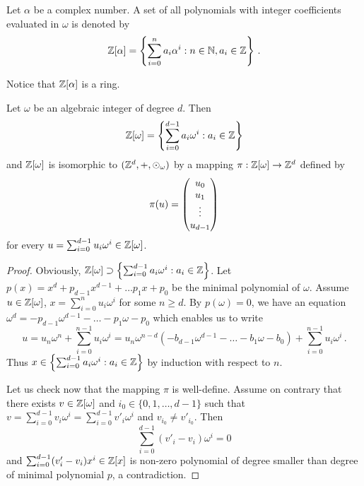 \begin{defn}
Let $\alpha$ be a complex number. A set of all polynomials with integer coefficients evaluated in $\omega$ is denoted by
$$
    \mathbb{Z}[\alpha] =\left\{\sum_{i=0}^n a_i \alpha^i : n\in\mathbb{N}, a_i\in\mathbb{Z} \right\}\,.
$$
\end{defn}
Notice that $\mathbb{Z}[\alpha]$ is a ring.

\begin{lem}
Let  $\omega$ be an algebraic integer of degree $d$. Then
$$
\mathbb{Z}[\omega] =\left\{\sum_{i=0}^{d-1} a_i \omega^i : a_i\in\mathbb{Z} \right\}
$$ 
and $\mathbb{Z}[\omega]$ is isomorphic to $(\mathbb{Z}^d,+,\odot_\omega)$ by a mapping $\pi:\mathbb{Z}[\omega] \rightarrow \mathbb{Z}^{d}$ defined by 
$$
\pi(u)=\begin{pmatrix} {u}_0 \\ {u}_1 \\ \vdots \\ {u}_{d-1} \end{pmatrix}
$$
 for every $u=\sum_{i=0}^{d-1} u_i \omega^i \in \mathbb{Z}[\omega]$. 
\end{lem}
\begin{proof}
Obviously, $\mathbb{Z}[\omega] \supset \left\{\sum_{i=0}^{d-1} a_i \omega^i : a_i\in\mathbb{Z} \right\}$. Let $p(x)=x^d +p_{d-1}x^{d-1}+ \dots p_1 x+p_0$ be the minimal polynomial of $\omega$. Assume $u\in \mathbb{Z}[\omega]$, $x=\sum_{i=0}^n u_i \omega^i$ for some $n\geq d$.  By $p(\omega)=0$, we have an equation $\omega^d =-p_{d-1}\omega^{d-1}- \dots -p_1\omega-p_0$ which enables us to write
$$
u=u_n\omega^n + \sum_{i=0}^{n-1} u_i \omega^i=u_n \omega^{n-d}(-b_{d-1}\omega^{d-1}- \dots -b_1\omega-b_0)+ \sum_{i=0}^{n-1} u_i \omega^i\,.
$$
Thus $x\in \left\{\sum_{i=0}^{d-1} a_i \omega^i : a_i\in\mathbb{Z} \right\}$ by  induction with respect to $n$.

Let us check now that the mapping $\pi$ is well-define. Assume on contrary that there exists $v\in \mathbb{Z}[\omega]$ and $i_0\in\{0,1,\dots,d-1\}$ such that $v=\sum_{i=0}^{d-1} v_i \omega^i=\sum_{i=0}^{d-1} v'_i \omega^i$ and $v_{i_0} \neq v'_{i_0}$. Then
$$
    \sum_{i=0}^{d-1} (v'_i-v_i) \omega^i=0
$$
and $\sum_{i=0}^{d-1} (v'_i-v_i) x^i \in \mathbb{Z}[x]$ is non-zero polynomial of degree smaller than degree of minimal polynomial $p$, a contradiction.


\end{proof}
